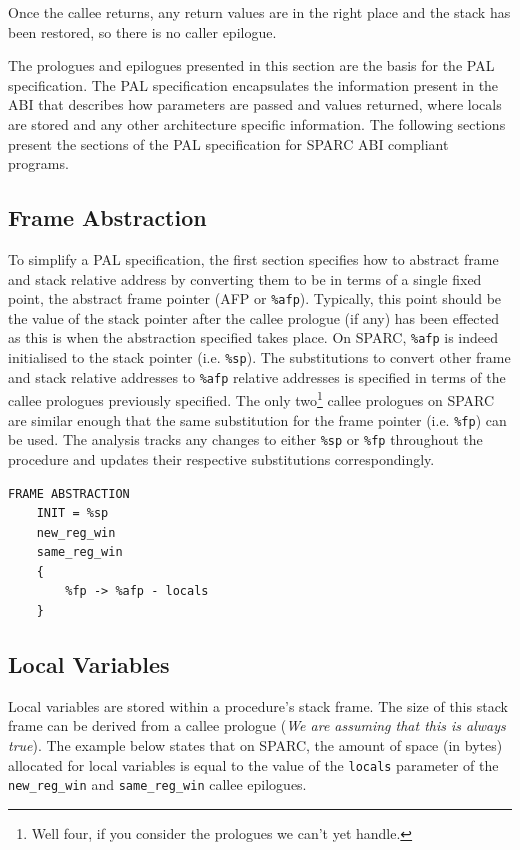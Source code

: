 Once the callee returns, any return values are in the right place
and the stack has been restored, so there is no caller epilogue.

The prologues and epilogues presented in this section are the basis
for the PAL specification. The PAL specification encapsulates the
information present in the ABI that describes how parameters are
passed and values returned, where locals are stored and any other
architecture specific information. The following sections present the
sections of the PAL specification for SPARC ABI compliant programs.

\subsection{Frame Abstraction}

To simplify a PAL specification, the first section specifies how to
abstract frame and stack relative address by converting them to be in
terms of a single fixed point, the abstract frame pointer (AFP or
{\tt \%afp}).  Typically, this point should be the value of the stack
pointer after the callee prologue (if any) has been effected as this
is when the abstraction specified takes place. On SPARC, {\tt \%afp}
is indeed initialised to the stack pointer (i.e. {\tt \%sp}). The
substitutions to convert other frame and stack relative addresses to
{\tt \%afp} relative addresses is specified in terms of the callee
prologues previously specified. The only two\footnote{Well four, if
you consider the prologues we can't yet handle.} callee prologues on
SPARC are similar enough that the same substitution for the frame
pointer (i.e. {\tt \%fp}) can be used.  The analysis tracks any
changes to either {\tt \%sp} or {\tt \%fp} throughout the procedure
and updates their respective substitutions correspondingly.

\begin{verbatim}
FRAME ABSTRACTION
    INIT = %sp
    new_reg_win
    same_reg_win
    {
        %fp -> %afp - locals
    }
\end{verbatim}


\subsection{Local Variables}
Local variables are stored within a procedure's stack frame. The size
of this stack frame can be derived from a callee prologue (\textit{We
are assuming that this is always true}). The example below states
that on SPARC, the amount of space (in bytes) allocated for local
variables is equal to the value of the {\tt locals} parameter of
the {\tt new\_reg\_win} and {\tt same\_reg\_win} callee epilogues.


